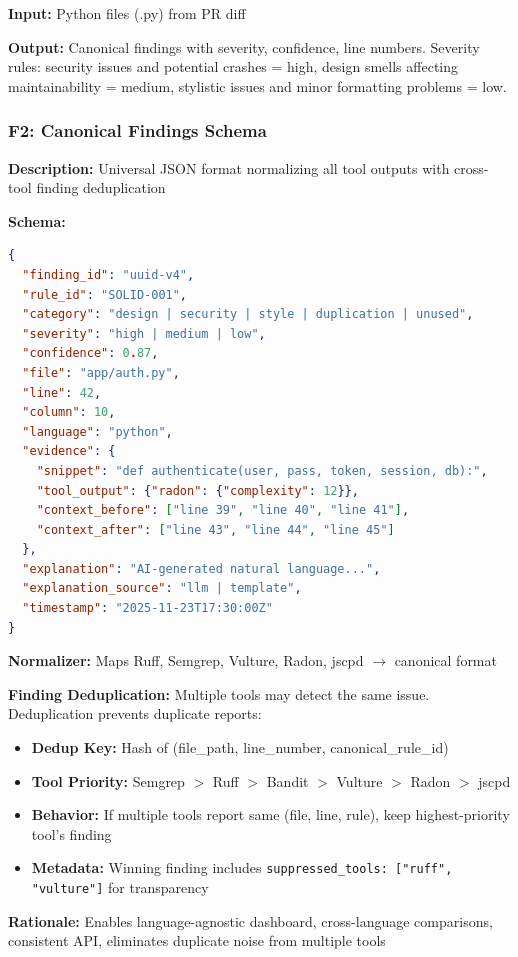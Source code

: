 \documentclass[11pt,a4paper]{article}
\begin{document}
\textbf{Input:} Python files (.py) from PR diff

\textbf{Output:} Canonical findings with severity, confidence, line numbers. Severity rules: security issues and potential crashes = high, design smells affecting maintainability = medium, stylistic issues and minor formatting problems = low.

\subsubsection{F2: Canonical Findings Schema}
\textbf{Description:} Universal JSON format normalizing all tool outputs with cross-tool finding deduplication

\textbf{Schema:}
\begin{lstlisting}[language=json]
{
  "finding_id": "uuid-v4",
  "rule_id": "SOLID-001",
  "category": "design | security | style | duplication | unused",
  "severity": "high | medium | low",
  "confidence": 0.87,
  "file": "app/auth.py",
  "line": 42,
  "column": 10,
  "language": "python",
  "evidence": {
    "snippet": "def authenticate(user, pass, token, session, db):",
    "tool_output": {"radon": {"complexity": 12}},
    "context_before": ["line 39", "line 40", "line 41"],
    "context_after": ["line 43", "line 44", "line 45"]
  },
  "explanation": "AI-generated natural language...",
  "explanation_source": "llm | template",
  "timestamp": "2025-11-23T17:30:00Z"
}
\end{lstlisting}

\textbf{Normalizer:} Maps Ruff, Semgrep, Vulture, Radon, jscpd $\rightarrow$ canonical format

\textbf{Finding Deduplication:} Multiple tools may detect the same issue. Deduplication prevents duplicate reports:
\begin{itemize}[leftmargin=*]
    \item \textbf{Dedup Key:} Hash of (file\_path, line\_number, canonical\_rule\_id)
    \item \textbf{Tool Priority:} Semgrep $>$ Ruff $>$ Bandit $>$ Vulture $>$ Radon $>$ jscpd
    \item \textbf{Behavior:} If multiple tools report same (file, line, rule), keep highest-priority tool's finding
    \item \textbf{Metadata:} Winning finding includes \texttt{suppressed\_tools: ["ruff", "vulture"]} for transparency
\end{itemize}

\textbf{Rationale:} Enables language-agnostic dashboard, cross-language comparisons, consistent API, eliminates duplicate noise from multiple tools
\end{document}
